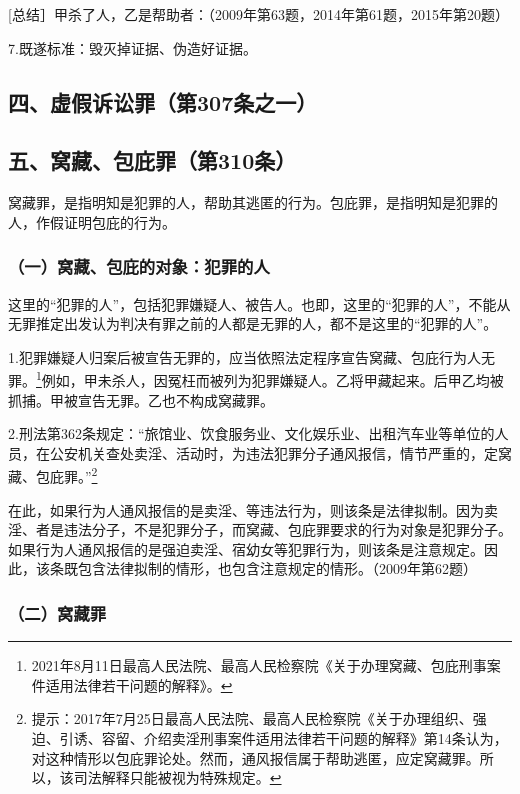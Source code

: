 [总结］甲杀了人，乙是帮助者：（2009年第63题，2014年第61题，2015年第20题）


7.既遂标准：毁灭掉证据、伪造好证据。

\subsection*{四、虚假诉讼罪（第307条之一）}


\subsection*{五、窝藏、包庇罪（第310条）}

窝藏罪，是指明知是犯罪的人，帮助其逃匿的行为。包庇罪，是指明知是犯罪的人，作假证明包庇的行为。

\subsubsection*{（一）窝藏、包庇的对象：犯罪的人}

这里的“犯罪的人”，包括犯罪嫌疑人、被告人。也即，这里的“犯罪的人”，不能从无罪推定出发认为判决有罪之前的人都是无罪的人，都不是这里的“犯罪的人”。

1.犯罪嫌疑人归案后被宣告无罪的，应当依照法定程序宣告窝藏、包庇行为人无罪。\footnote{2021年8月11日最高人民法院、最高人民检察院《关于办理窝藏、包庇刑事案件适用法律若干问题的解释》。}例如，甲未杀人，因冤枉而被列为犯罪嫌疑人。乙将甲藏起来。后甲乙均被抓捕。甲被宣告无罪。乙也不构成窝藏罪。

2.刑法第362条规定：“旅馆业、饮食服务业、文化娱乐业、出租汽车业等单位的人员，在公安机关查处卖淫、活动时，为违法犯罪分子通风报信，情节严重的，定窝藏、包庇罪。”\footnote{提示：2017年7月25日最高人民法院、最高人民检察院《关于办理组织、强迫、引诱、容留、介绍卖淫刑事案件适用法律若干问题的解释》第14条认为，对这种情形以包庇罪论处。然而，通风报信属于帮助逃匿，应定窝藏罪。所以，该司法解释只能被视为特殊规定。}

在此，如果行为人通风报信的是卖淫、等违法行为，则该条是法律拟制。因为卖淫、者是违法分子，不是犯罪分子，而窝藏、包庇罪要求的行为对象是犯罪分子。如果行为人通风报信的是强迫卖淫、宿幼女等犯罪行为，则该条是注意规定。因此，该条既包含法律拟制的情形，也包含注意规定的情形。（2009年第62题）

\subsubsection*{（二）窝藏罪}

